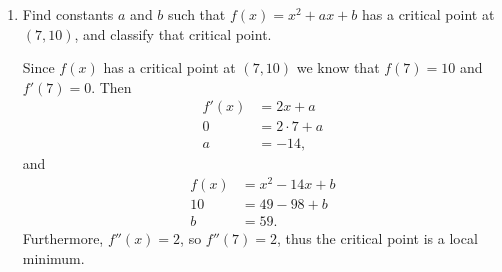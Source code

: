 \documentclass[11pt]{article}
\begin{document}
\pagestyle{empty}
\newsavebox{\quizfront}
\begin{lrbox}{\quizfront}
\begin{minipage}[top][4.5in][t]{\textwidth} \setlength{\parindent}{1.5em}
\drawtitle
\vspace{-0.5in}
\begin{enumerate}

\item Find constants $a$ and $b$ such that $f(x)=x^2+ax+b$ has a
  critical point at $(7,10)$, and classify that critical point.

  \vfill
  {\color{blue}

    Since $f(x)$ has a critical point at $(7,10)$ we know that
    $f(7)=10$ and $f'(7)=0$.  Then
    \begin{align*}
      f'(x) &= 2x+a\\
      0 &= 2\cdot 7+a\\
      a &= -14,
    \end{align*}
    and
    \begin{align*}
      f(x) &= x^2-14x+b\\
      10 &= 49-98+b\\
      b &= 59.
    \end{align*}
    Furthermore, $f''(x) = 2$, so $f''(7)=2$, thus the critical point
    is a local minimum.

  }

\end{enumerate}

\vfill

\end{minipage}
\end{lrbox}
\end{document}
